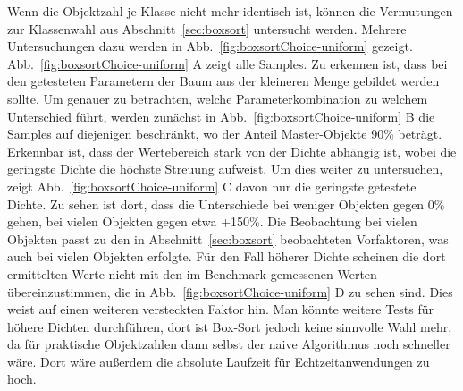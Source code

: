 Wenn die Objektzahl je Klasse nicht mehr identisch ist, können die Vermutungen zur Klassenwahl aus Abschnitt~\ref{sec:boxsort} untersucht werden. Mehrere Untersuchungen dazu werden in Abb.~\ref{fig:boxsortChoice-uniform} gezeigt. Abb.~\ref{fig:boxsortChoice-uniform} A zeigt alle Samples. Zu erkennen ist, dass bei den getesteten Parametern der Baum aus der kleineren Menge gebildet werden sollte. Um genauer zu betrachten, welche Parameterkombination zu welchem Unterschied führt, werden zunächst in Abb.~\ref{fig:boxsortChoice-uniform} B die Samples auf diejenigen beschränkt, wo der Anteil Master-Objekte 90\% beträgt. Erkennbar ist, dass der Wertebereich stark von der Dichte abhängig ist, wobei die geringste Dichte die höchste Streuung aufweist. Um dies weiter zu untersuchen, zeigt Abb.~\ref{fig:boxsortChoice-uniform} C davon nur die geringste getestete Dichte. Zu sehen ist dort, dass die Unterschiede bei weniger Objekten gegen 0\% gehen, bei vielen Objekten gegen etwa +150\%. Die Beobachtung bei vielen Objekten passt zu den in Abschnitt~\ref{sec:boxsort} beobachteten Vorfaktoren, was auch bei vielen Objekten erfolgte. Für den Fall höherer Dichte scheinen die dort ermittelten Werte nicht mit den im Benchmark gemessenen Werten übereinzustimmen, die in Abb.~\ref{fig:boxsortChoice-uniform} D zu sehen sind. Dies weist auf einen weiteren versteckten Faktor hin. Man könnte weitere Tests für höhere Dichten durchführen, dort ist Box-Sort jedoch keine sinnvolle Wahl mehr, da für praktische Objektzahlen dann selbst der naive Algorithmus noch schneller wäre. Dort wäre außerdem die absolute Laufzeit für Echtzeitanwendungen zu hoch.\\

